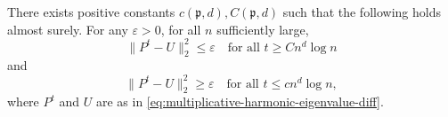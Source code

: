 \documentclass[12pt]{amsart}
\numberwithin{equation}{section}
\begin{document}
	\begin{theorem} \label{theorem:slow-mixing-percolation}
		There exists positive constants $c(\mathfrak{p}, d), C(\mathfrak{p},d)$ such that the following holds almost surely.
		For any $\varepsilon > 0$, for all $n$ sufficiently large, 
		\begin{equation} \label{eq:l2-mixing-time-upper-bound}
			\| P^t - U\|_2^2 \leq \varepsilon \quad \mbox{for all $t \geq C n^d \log n$}
		\end{equation}
		and
		\begin{equation} \label{eq:l2-mixing-time-lower-bound}
			\| P^t - U\|_2^2 \geq \varepsilon \quad \mbox{for all $t \leq c n^d \log n$},
		\end{equation}
		where $P^t$ and $U$ are as in \eqref{eq:multiplicative-harmonic-eigenvalue-diff}. 
	\end{theorem}
\end{document}
